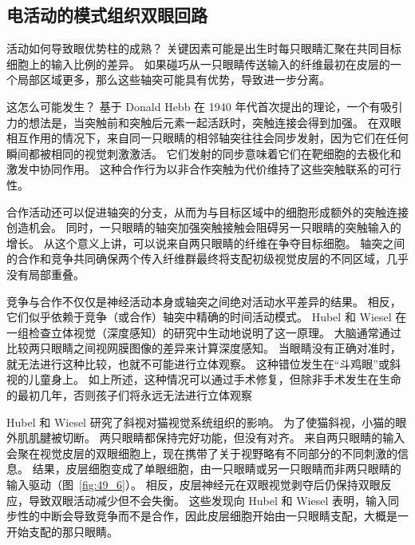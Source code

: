 \subsection{电活动的模式组织双眼回路}

活动如何导致眼优势柱的成熟？
关键因素可能是出生时每只眼睛汇聚在共同目标细胞上的输入比例的差异。
如果碰巧从一只眼睛传送输入的纤维最初在皮层的一个局部区域更多，那么这些轴突可能具有优势，导致进一步分离。


这怎么可能发生？
基于 Donald Hebb 在 1940 年代首次提出的理论，一个有吸引力的想法是，当突触前和突触后元素一起活跃时，突触连接会得到加强。
在双眼相互作用的情况下，来自同一只眼睛的相邻轴突往往会同步发射，因为它们在任何瞬间都被相同的视觉刺激激活。
它们发射的同步意味着它们在靶细胞的去极化和激发中协同作用。
这种合作行为以非合作突触为代价维持了这些突触联系的可行性。


合作活动还可以促进轴突的分支，从而为与目标区域中的细胞形成额外的突触连接创造机会。
同时，一只眼睛的轴突加强突触接触会阻碍另一只眼睛的突触输入的增长。
从这个意义上讲，可以说来自两只眼睛的纤维在争夺目标细胞。
轴突之间的合作和竞争共同确保两个传入纤维群最终将支配初级视觉皮层的不同区域，几乎没有局部重叠。


竞争与合作不仅仅是神经活动本身或轴突之间绝对活动水平差异的结果。
相反，它们似乎依赖于竞争（或合作）轴突中精确的时间活动模式。
Hubel 和 Wiesel 在一组检查立体视觉（深度感知）的研究中生动地说明了这一原理。
大脑通常通过比较两只眼睛之间视网膜图像的差异来计算深度感知。
当眼睛没有正确对准时，就无法进行这种比较，也就不可能进行立体观察。
这种错位发生在“斗鸡眼”或斜视的儿童身上。
如上所述，这种情况可以通过手术修复，但除非手术发生在生命的最初几年，否则孩子们将永远无法进行立体观察


Hubel 和 Wiesel 研究了斜视对猫视觉系统组织的影响。
为了使猫斜视，小猫的眼外肌肌腱被切断。 两只眼睛都保持完好功能，但没有对齐。
来自两只眼睛的输入会聚在视觉皮层的双眼细胞上，现在携带了关于视野略有不同部分的不同刺激的信息。
结果，皮层细胞变成了单眼细胞，由一只眼睛或另一只眼睛而非两只眼睛的输入驱动（图~\ref{fig:49_6}）。 
相反，皮层神经元在双眼视觉剥夺后仍保持双眼反应，导致双眼活动减少但不会失衡。
这些发现向 Hubel 和 Wiesel 表明，输入同步性的中断会导致竞争而不是合作，因此皮层细胞开始由一只眼睛支配，大概是一开始支配的那只眼睛。


